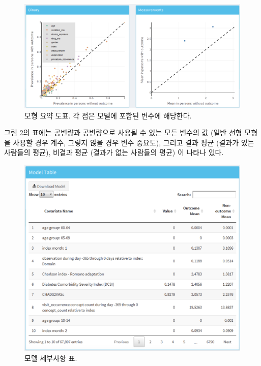 \documentclass[11pt]{book}
\theoremstyle{definition}
\theoremstyle{definition}
\theoremstyle{definition}
\theoremstyle{remark}
\begin{document}
\begin{figure}

{\centering \includegraphics[width=1\linewidth]{images/PatientLevelPrediction/shiny/shinyModelPlots} 

}

\caption{모형 요약 도표. 각 점은 모델에 포함된 변수에 해당한다.}\label{fig:shinyModelPlots}
\end{figure}

그림 \ref{fig:shinyModelTable}의 표에는 공변량과 공변량으로 사용될 수
있는 모든 변수의 값 (일반 선형 모형을 사용할 경우 계수, 그렇지 않을 경우
변수 중요도), 그리고 결과 평균 (결과가 있는 사람들의 평균), 비결과 평균
(결과가 없는 사람들의 평균) 이 나타나 있다.

\begin{figure}

{\centering \includegraphics[width=1\linewidth]{images/PatientLevelPrediction/shiny/shinyModelTable} 

}

\caption{모델 세부사항 표.}\label{fig:shinyModelTable}
\end{figure}
\end{document}
